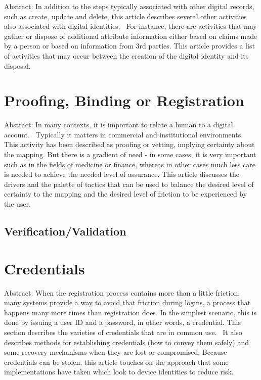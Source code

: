 Abstract: In addition to the steps typically associated with other
digital records, such as create, update and delete, this article
describes several other activities also associated with digital
identities.~ For instance, there are activities that may gather or
dispose of additional attribute information either based on claims made
by a person or based on information from 3rd parties. This article
provides a list of activities that may occur between the creation of the
digital identity and its disposal.

\hypertarget{proofing-binding-or-registration}{%
\section{Proofing, Binding or Registration
}\label{proofing-binding-or-registration}}

Abstract: In many contexts, it is important to relate a human to a
digital account.~ Typically it matters in commercial and institutional
environments. This activity has been described as proofing or vetting,
implying certainty about the mapping. But there is a gradient of need -
in some cases, it is very important such as in the fields of medicine or
finance, whereas in other cases much less care is needed to achieve the
needed level of assurance. This article discusses the drivers and the
palette of tactics that can be used to balance the desired level of
certainty to the mapping and the desired level of friction to be
experienced by the user.

\hypertarget{verificationvalidation}{%
\subsection{Verification/Validation}\label{verificationvalidation}}

\hypertarget{credentials}{%
\section{Credentials}\label{credentials}}

Abstract: When the registration process contains more than a little
friction, many systems provide a way to avoid that friction during
logins, a process that happens many more times than registration does.
In the simplest scenario, this is done by issuing a user ID and a
password, in other words, a credential. This section describes the
varieties of credentials that are in common use.~ It also describes
methods for establishing credentials (how to convey them safely) and
some recovery mechanisms when they are lost or compromised. Because
credentials can be stolen, this article touches on the approach that
some implementations have taken which look to device identities to
reduce risk.

